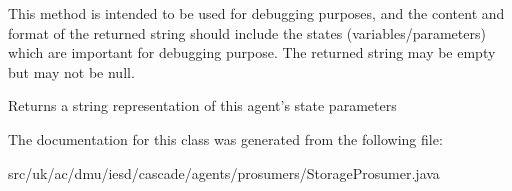 This method is intended to be used for debugging purposes, and the content and format of the returned string should include the states (variables/parameters) which are important for debugging purpose. The returned string may be empty but may not be {\ttfamily null}.

\begin{DoxyReturn}{Returns}
a string representation of this agent's state parameters 
\end{DoxyReturn}


The documentation for this class was generated from the following file\-:\begin{DoxyCompactItemize}
\item 
src/uk/ac/dmu/iesd/cascade/agents/prosumers/Storage\-Prosumer.\-java\end{DoxyCompactItemize}

